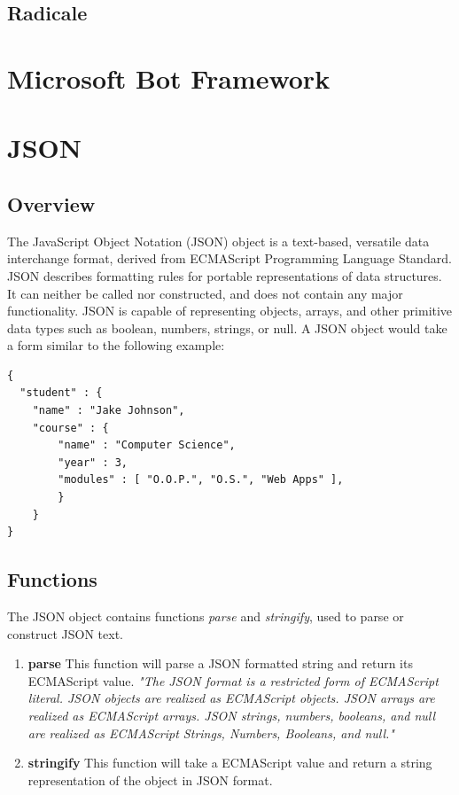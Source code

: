 \subsection{Radicale}

\section{Microsoft Bot Framework}

\section{JSON}
\subsection{Overview}
	The JavaScript Object Notation (JSON) object is a text-based, versatile data interchange format, derived from ECMAScript Programming Language Standard. JSON describes formatting rules for portable representations of data structures\cite{crockford}. It can neither be called nor constructed, and does not contain any major functionality\cite{ecma}. JSON is capable of representing objects, arrays, and other primitive data types such as boolean, numbers, strings, or null\cite{crockford}.  A JSON object would take a form similar to the following example:
\begin{lstlisting}
{
  "student" : {
	"name" : "Jake Johnson",
	"course" : {
		"name" : "Computer Science",
		"year" : 3,
		"modules" : [ "O.O.P.", "O.S.", "Web Apps" ],
		}
  	}
}
\end{lstlisting}
\subsection{Functions}
The JSON object contains functions \emph{parse} and \emph{stringify}, used to parse or construct JSON text. 
\begin{enumerate}
\item \textbf{parse} This function will parse a JSON formatted string and return its ECMAScript value. \emph{"The JSON format is a restricted form of ECMAScript literal. JSON objects are realized as ECMAScript objects. JSON arrays are realized as ECMAScript arrays. JSON strings, numbers, booleans, and null are realized as ECMAScript Strings, Numbers, Booleans, and null."\cite{crockford}}
\item \textbf{stringify} This function will take a ECMAScript value and return a string representation of the object in JSON format. \cite{crockford}
\end{enumerate}
